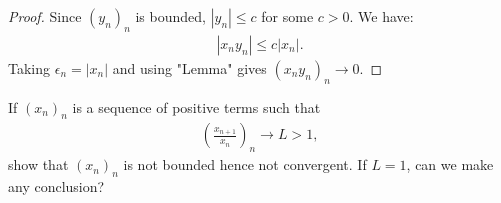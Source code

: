 \documentclass[10pt,twoside,openany]{memoir}
\begin{document}
        \begin{proof}
            Since $(y_n)_n$ is bounded, $|y_n| \leq c$ for some $c > 0$. We have:
                \begin{equation*}
                \begin{split}
                    |x_n y_n| \leq c|x_n|.
                \end{split}
                \end{equation*}
            Taking $\epsilon_n = |x_n|$ and using "Lemma" gives $(x_n y_n)_n \rightarrow 0$.
        \end{proof}
    \begin{exercise}
        If $(x_n)_n$ is a sequence of positive terms such that
            \begin{equation*}
            \begin{split}
                \left(\frac{x_{n+1}}{x_n}\right)_n \rightarrow L > 1,
            \end{split}
            \end{equation*}
        show that $(x_n)_n$ is not bounded hence not convergent. If $L=1$, can we make any conclusion?
    \end{exercise}
\end{document}

